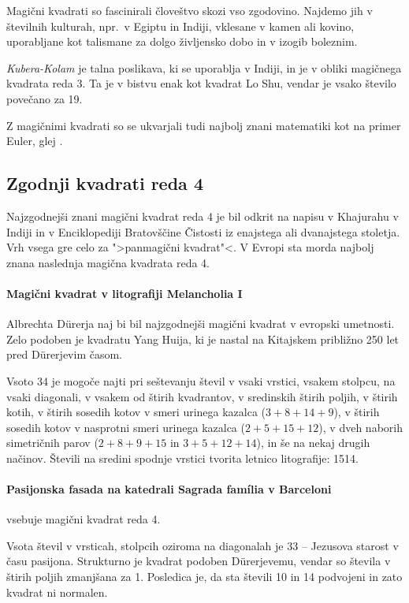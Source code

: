 \documentclass[a4paper,12pt]{article}
\begin{document}
Magični kvadrati so fascinirali človeštvo skozi vso zgodovino. Najdemo jih
v številnih kulturah, npr.\ v Egiptu in Indiji, vklesane v kamen ali
kovino, uporabljane kot talismane za dolgo življensko dobo in v
izogib boleznim.

\emph{Kubera-Kolam} je talna poslikava, ki se uporablja v Indiji, in je v
obliki magičnega kvadrata reda 3. Ta je v bistvu enak kot kvadrat
Lo Shu, vendar je vsako število povečano za 19.

Z magičnimi kvadrati so se ukvarjali tudi najbolj znani matematiki kot na
primer Euler, glej \cite{euler}. %


\subsection{Zgodnji kvadrati reda 4}

Najzgodnejši znani magični kvadrat reda 4 je bil odkrit na napisu
v Khajurahu v Indiji in v Enciklopediji Bratovščine Čistosti iz enajstega
ali dvanajstega stoletja. Vrh vsega gre celo za ">panmagični kvadrat"<.
V Evropi sta morda najbolj znana naslednja magična kvadrata reda 4.

\paragraph{Magični kvadrat v litografiji Melancholia I}
Albrechta Dürerja naj bi bil najzgodnejši magični kvadrat
v evropski umetnosti. Zelo podoben je kvadratu Yang Huija, ki je nastal na Kitajskem
približno 250 let pred Dürerjevim časom.

Vsoto 34 je mogoče najti pri seštevanju števil v vsaki vrstici, vsakem stolpcu,
na vsaki diagonali, v vsakem od štirih kvadrantov, v sredinskih štirih poljih,
v štirih kotih, v štirih sosedih kotov v smeri urinega kazalca (\(3+8+14+9\)), v
štirih sosedih kotov v nasprotni smeri urinega kazalca (\(2+5+15+12\)), v dveh naborih
simetričnih parov (\(2+8+9+15\) in \(3+5+12+14\)), in še na nekaj drugih načinov.
Števili na sredini spodnje vrstici tvorita letnico litografije: 1514.

\paragraph{Pasijonska fasada na katedrali Sagrada família v Barceloni}
vsebuje magični kvadrat reda 4.

Vsota števil v vrsticah, stolpcih oziroma na diagonalah je 33 -- Jezusova starost
v času pasijona. Strukturno je kvadrat podoben Dürerjevemu, vendar so števila
v štirih poljih zmanjšana za 1. Posledica je, da sta števili 10 in 14 podvojeni
in zato kvadrat ni normalen.
\end{document}
